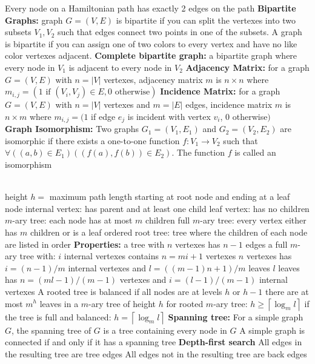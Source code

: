 \documentclass{article}
\newcommand{\upspace}{\vspace{0px}}
\newcommand{\bksp}{\hspace{-3px}}
\newcommand{\zzz}[1]{\upspace \0\bksp{\large\textbf{#1:}}\addcontentsline{toc}{subsection}{#1}}
\newcommand{\aaa}{\upspace \1\bksp}
\newcommand{\bbb}{\upspace \2\bksp}
\newcommand{\ceil}[1]{\left\lceil #1 \right\rceil}
\newcommand{\tbf}[1]{\textbf{#1}}
\begin{document}
\begin{multicols*}{2}
\begin{outline}[compactitem]
	\aaa Every node on a Hamiltonian path has exactly 2 edges on the path
\0\tbf{Bipartite Graphs:}
	\aaa graph $G = (V,E)$ is bipartite if you can split the vertexes into two subsets $V_1,V_2$ such that edges connect two points in one of the subsets. A graph is bipartite if you can assign one of two colors to every vertex and have no like color vertexes adjacent.
\0\tbf{Complete bipartite graph:} 
	\aaa a bipartite graph where every node in $V_1$ is adjacent to every node in $V_2$
\0\tbf{Adjacency Matrix:} 
	\aaa for a graph $G = (V,E)$ with $n=|V|$ vertexes, adjacency matrix $m$ is $n\times n$ where
 $m_{i,j} = ( 1\mbox{ if }(V_i,V_j) \in E, 0 \mbox{ otherwise})$
\0\tbf{Incidence Matrix:}
	\aaa for a graph $G = (V,E)$ with $n=|V|$ vertexes and $m=|E|$ edges, incidence matrix $m$ is $n\times m$ where 
 $m_{i,j} = ( 1$ if edge $e_j$ is incident with vertex $v_i$, $0$ otherwise$)$
\\
\0\tbf{Graph Isomorphism:} 
	\aaa Two graphs $G_1 = (V_1,E_1)$ and $G_2 = (V_2,E_2)$ are isomorphic if there exists a one-to-one function $f: V_1 \rightarrow V_2$ such that $\forall ((a,b) \in E_1) ((f(a),f(b))\in E_2 )$. The function $f$ is called an isomorphism
\\
\\
\zzz{Trees}
	\aaa height $h =$ maximum path length starting at root node and ending at a leaf node
	\aaa internal vertex: has parent and at least one child
	\aaa leaf vertex: has no children
	\aaa $m$-ary tree: each node has at most $m$ children
	\aaa full $m$-ary tree: every vertex either has $m$ children or is a leaf
	\aaa ordered root tree: tree where the children of each node are listed in order
\0 \tbf{Properties:}
	\aaa a tree with $n$ vertexes has $n-1$ edges
	\aaa a full $m$-ary tree with:
		\bbb $i$ internal vertexes contains $n=mi+1$ vertexes
		\bbb $n$ vertexes has $i = (n-1)/m$ internal vertexes and $l=\left((m-1)n+1\right)/m$ leaves
		\bbb $l$ leaves has $n=(ml-1)/(m-1)$ vertexes and $i=(l-1)/(m-1)$ internal vertexes
	\aaa A rooted tree is balanced if all nodes are at levels $h$ or $h-1$
	\aaa there are at most $m^h$ leaves in a $m$-ary tree of height $h$
	\aaa for rooted $m$-ary tree:
		\bbb $h \geq \ceil{\log_m l}$
		\bbb if the tree is full and balanced: $h = \ceil{\log_m l}$
\0 \tbf{Spanning tree:}
	\aaa For a simple graph $G$, the spanning tree of $G$ is a tree containing every node in $G$
	\aaa A simple graph is connected if and only if it has a spanning tree
\0\tbf{Depth-first search}
	\aaa All edges in the resulting tree are tree edges
	\aaa All edges not in the resulting tree are back edges

\end{outline}
\end{multicols*}
\end{document}
